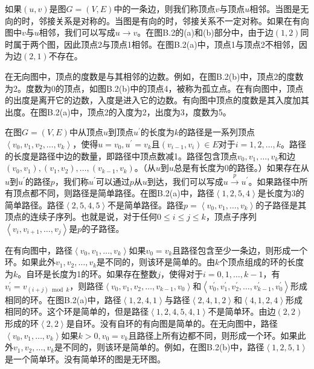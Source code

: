 \documentclass[lang=cn,newtx,10pt,scheme=chinese]{elegantbook}
\begin{document}
如果$(u,v)$是图$G=(V,E)$中的一条边，则我们称顶点$v$与顶点$u$相邻。当图是无向的时，邻接关系是对称的。当图是有向的时，邻接关系不一定对称。如果在有向图中$v$与$u$相邻，我们可以写成$u\rightarrow v$。在图B.2的(a)和(b)部分中，由于边$(1,2)$同时属于两个图，因此顶点2与顶点1相邻。在图B.2(a)中，顶点1与顶点2不相邻，因为边$(2,1)$不存在。

在无向图中，顶点的度数是与其相邻的边数。例如，在图B.2(b)中，顶点2的度数为2。度数为0的顶点，如图B.2(b)中的顶点4，被称为孤立点。在有向图中，顶点的出度是离开它的边数，入度是进入它的边数。有向图中顶点的度数是其入度加其出度。在图B.2(a)中，顶点2的入度为2，出度为3，度数为5。

在图$G=(V,E)$中从顶点$u$到顶点$u^{\prime}$的长度为$k$的路径是一系列顶点$\left\langle v_0,v_1,v_2,\ldots,v_k\right\rangle$，使得$u=v_0,u^{\prime}=v_k$且$\left(v_{i-1},v_i\right)\in E$对于$i=1,2,\ldots,k$。路径的长度是路径中边的数量，即路径中顶点数减1。路径包含顶点$v_0,v_1,\ldots,v_k$和边$\left(v_0,v_1\right),\left(v_1,v_2\right),\ldots,\left(v_{k-1},v_k\right)$。（从$u$到$u$总是有长度为0的路径。）如果存在从$u$到$u^{\prime}$的路径$p$，我们称$u^{\prime}$可以通过$p$从$u$到达，我们可以写成$u\stackrel{p}{\longrightarrow}u^{\prime}$。如果路径中所有顶点都不同，则路径是简单路径。在图B.2(a)中，路径$\left\langle 1,2,5,4\right\rangle$是长度为3的简单路径。路径$\left\langle 2,5,4,5\right\rangle$不是简单路径。路径$p=\left\langle v_0,v_1,\ldots,v_k\right\rangle$的子路径是其顶点的连续子序列。也就是说，对于任何$0 \leq i \leq j \leq k$，顶点子序列$\left\langle v_i,v_{i+1},\ldots,v_j\right\rangle$是$p$的子路径。

在有向图中，路径$\left\langle v_0, v_1, \ldots, v_k\right\rangle$如果$v_0=v_k$且路径包含至少一条边，则形成一个环。如果此外$v_1, v_2, \ldots, v_k$是不同的，则该环是简单的。由$k$个顶点组成的环的长度为$k$。自环是长度为1的环。如果存在整数$j$，使得对于$i=0,1,\ldots,k-1$，有$v_i^{\prime}=v_{(i+j) \bmod k}$，则路径$\left\langle v_0, v_1, v_2, \ldots, v_{k-1}, v_0\right\rangle$和$\left\langle v_0^{\prime}, v_1^{\prime}, v_2^{\prime}, \ldots, v_{k-1}^{\prime}, v_0^{\prime}\right\rangle$形成相同的环。在图B.2(a)中，路径$\left\langle 1,2,4,1\right\rangle$与路径$\left\langle 2,4,1,2\right\rangle$和$\left\langle 4,1,2,4\right\rangle$形成相同的环。这个环是简单的，但是路径$\left\langle 1,2,4,5,4,1\right\rangle$不是简单环。由边$(2,2)$形成的环$\left\langle 2,2\right\rangle$是自环。没有自环的有向图是简单的。在无向图中，路径$\left\langle v_0, v_1, \ldots, v_k\right\rangle$如果$k>0,v_0=v_k$且路径上所有边都不同，则形成一个环。如果此外$v_1,v_2,\ldots,v_k$是不同的，则该环是简单的。例如，在图B.2(b)中，路径$\left\langle 1,2,5,1\right\rangle$是一个简单环。没有简单环的图是无环图。
\end{document}

